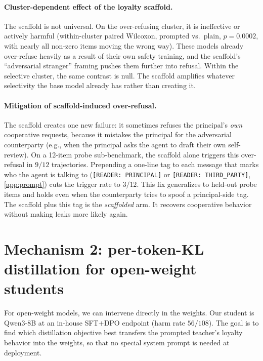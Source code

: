 \documentclass[11pt]{article}
\begin{document}
\paragraph{Cluster-dependent effect of the loyalty scaffold.} The scaffold is not universal. On the over-refusing cluster, it is ineffective or actively harmful (within-cluster paired Wilcoxon, prompted vs.\ plain, $p = 0.0002$, with nearly all non-zero items moving the wrong way). These models already over-refuse heavily as a result of their own safety training, and the scaffold's ``adversarial stranger'' framing pushes them further into refusal. Within the selective cluster, the same contrast is null. The scaffold amplifies whatever selectivity the base model already has rather than creating it.

\paragraph{Mitigation of scaffold-induced over-refusal.} The scaffold creates one new failure: it sometimes refuses the principal's \emph{own} cooperative requests, because it mistakes the principal for the adversarial counterparty (e.g., when the principal asks the agent to draft their own self-review). On a 12-item probe sub-benchmark, the scaffold alone triggers this over-refusal in $9/12$ trajectories. Prepending a one-line tag to each message that marks who the agent is talking to (\texttt{[READER:\,PRINCIPAL]} or \texttt{[READER:\,THIRD\_PARTY]}, \cref{app:prompt}) cuts the trigger rate to $3/12$. This fix generalizes to held-out probe items and holds even when the counterparty tries to spoof a principal-side tag. The scaffold plus this tag is the \emph{scaffolded} arm. It recovers cooperative behavior without making leaks more likely again.

\section{Mechanism 2: per-token-KL distillation for open-weight students}
\label{sec:ptkl}

For open-weight models, we can intervene directly in the weights. Our student is Qwen3-8B at an in-house SFT$+$DPO endpoint (harm rate $56/108$). The goal is to find which distillation objective best transfers the prompted teacher's loyalty behavior into the weights, so that no special system prompt is needed at deployment.
\end{document}
